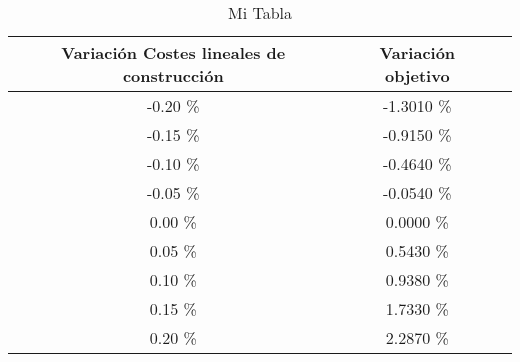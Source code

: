 \begin{table}
\centering
\begin{tabular}{|c|c|c|}
\hline
 Variación Costes lineales de construcción & Variación objetivo \\ \hline
-0.20 \% & -1.3010 \% \\ \hline
-0.15 \% & -0.9150 \% \\ \hline
-0.10 \% & -0.4640 \% \\ \hline
-0.05 \% & -0.0540 \% \\ \hline
0.00 \% & 0.0000 \% \\ \hline
0.05 \% & 0.5430 \% \\ \hline
0.10 \% & 0.9380 \% \\ \hline
0.15 \% & 1.7330 \% \\ \hline
0.20 \% & 2.2870 \% \\ \hline
\end{tabular}
\caption{Mi Tabla}
\end{table}
